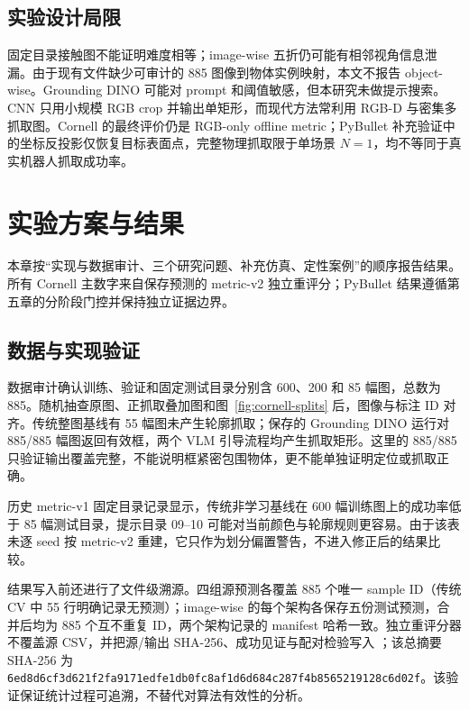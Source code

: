 \documentclass{l4proj}
\begin{document}
\section{实验设计局限}
固定目录接触图不能证明难度相等；image-wise 五折仍可能有相邻视角信息泄漏。由于现有文件缺少可审计的 885 图像到物体实例映射，本文不报告 object-wise。Grounding DINO 可能对 prompt 和阈值敏感，但本研究未做提示搜索。CNN 只用小规模 RGB crop 并输出单矩形，而现代方法常利用 RGB-D 与密集多抓取图。Cornell 的最终评价仍是 RGB-only offline metric；PyBullet 补充验证中的坐标反投影仅恢复目标表面点，完整物理抓取限于单场景 $N=1$，均不等同于真实机器人抓取成功率。

\chapter{实验方案与结果}

本章按“实现与数据审计、三个研究问题、补充仿真、定性案例”的顺序报告结果。所有 Cornell 主数字来自保存预测的 metric-v2 独立重评分；PyBullet 结果遵循第五章的分阶段门控并保持独立证据边界。

\section{数据与实现验证}
数据审计确认训练、验证和固定测试目录分别含 600、200 和 85 幅图，总数为 885。随机抽查原图、正抓取叠加图和图~\ref{fig:cornell-splits} 后，图像与标注 ID 对齐。传统整图基线有 55 幅图未产生轮廓抓取；保存的 Grounding DINO 运行对 885/885 幅图返回有效框，两个 VLM 引导流程均产生抓取矩形。这里的 885/885 只验证输出覆盖完整，不能说明框紧密包围物体，更不能单独证明定位或抓取正确。

历史 metric-v1 固定目录记录显示，传统非学习基线在 600 幅训练图上的成功率低于 85 幅测试目录，提示目录 09--10 可能对当前颜色与轮廓规则更容易。由于该表未逐 seed 按 metric-v2 重建，它只作为划分偏置警告，不进入修正后的结果比较。

结果写入前还进行了文件级溯源。四组源预测各覆盖 885 个唯一 sample ID（传统 CV 中 55 行明确记录无预测）；image-wise 的每个架构各保存五份测试预测，合并后均为 885 个互不重复 ID，两个架构记录的 manifest 哈希一致。独立重评分器不覆盖源 CSV，并把源/输出 SHA-256、成功见证与配对检验写入 ；该总摘要 SHA-256 为 {\footnotesize\texttt{6ed8d6cf3d621f2f\allowbreak{}a9171edfe1db0fc\allowbreak{}8af1d6d684c287f4\allowbreak{}b8565219128c6d02f}}。该验证保证统计过程可追溯，不替代对算法有效性的分析。
\end{document}
